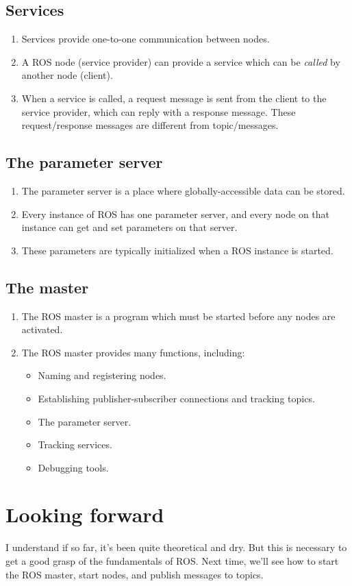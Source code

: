 \documentclass{article}
\begin{document}
        \subsection{Services}
            \begin{enumerate}
                \item Services provide one-to-one communication between nodes.
                \item A ROS node (service provider) can provide a service which can be \emph{called}
                by another node (client).
                \item When a service is called, a request message is sent from the client to the service provider,
                which can reply with a response message. These request/response messages are different from topic/messages. 
            \end{enumerate}
        \subsection{The parameter server}
            \begin{enumerate}
                \item The parameter server is a place where globally-accessible data can be stored.
                \item Every instance of ROS has one parameter server, and every node on that instance can 
                get and set parameters on that server.
                \item These parameters are typically initialized when a ROS instance is started.
            \end{enumerate}
        \subsection{The master}
            \begin{enumerate}
                \item The ROS master is a program which must be started before any nodes are activated.
                \item The ROS master provides many functions, including:
                \begin{itemize}
                    \item Naming and registering nodes.
                    \item Establishing publisher-subscriber connections and tracking topics.
                    \item The parameter server.
                    \item Tracking services.
                    \item Debugging tools.
                \end{itemize}
            \end{enumerate}
    \section{Looking forward}
        I understand if so far, it's been quite theoretical and dry. But this is necessary to get a good grasp of the 
        fundamentals of ROS. Next time, we'll see how to start the ROS master, start nodes, and publish messages to topics.
\end{document}
